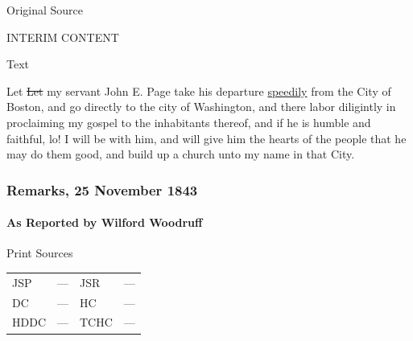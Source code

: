 			\begin{description}
				\item[Original Source]
			\end{description}
			
				INTERIM CONTENT
			
			
			\begin{description}
				\item[Text]
			\end{description}
			
				Let \sout{Let} my servant John E. Page take his departure \uline{speedily} from the City of Boston, and go directly to the city of Washington, and there labor diligintly in proclaiming my gospel to the inhabitants thereof, and if he is humble and faithful, lo! I will be with him, and will give him the hearts of the people that he may do them good, and build up a church unto my name in that City.
				
		\subsubsection{Remarks, 25 November 1843}
			\label{EMS-1843-JS-25-NOV-1843-REM}
			
			\paragraph{As Reported by Wilford Woodruff}
				\label{EMS-1843-JS-25-NOV-1843-REM-WW}
			
				\begin{description}
					\item[Print Sources]
				\end{description}

					\begin{tabular}{p{0.5in}p{1in}p{0.5in}p{1in}}
					JSP	 	& ---		& JSR 		& --- \\
					DC	 	& ---		& HC 		& --- \\
					HDDC 	& ---		& TCHC 		& --- \\
					\end{tabular}
				
